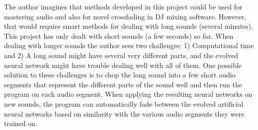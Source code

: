 

The author imagines that methods developed in this project could be used for mastering audio and also for novel crossfading in DJ mixing software. However, that would require smart methods for dealing with long sounds (several minutes). This project has only dealt with short sounds (a few seconds) so far. When dealing with longer sounds the author sees two challenges: 1) Computational time and 2) A long sound might have several very different parts, and the evolved neural network might have trouble dealing well with all of them. One possible solution to these challenges is to chop the long sound into a few short audio segments that represent the different parts of the sound well and then run the program on each audio segment. When applying the resulting neural networks on new sounds, the program can automatically fade between the evolved artificial neural networks based on similarity with the various audio segments they were trained on.
